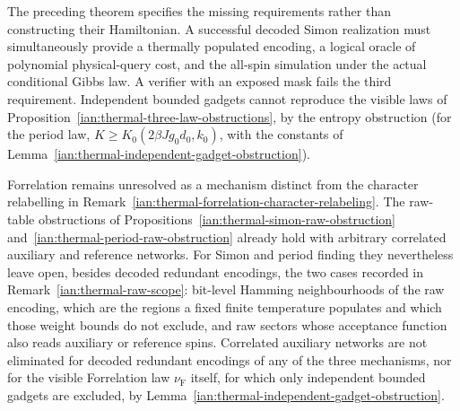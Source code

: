 \begin{remark}
\label{ian:thermal-realization-open}
The preceding theorem specifies the missing requirements rather than
constructing their Hamiltonian. A successful decoded Simon
realization must simultaneously provide a thermally populated
encoding, a logical oracle of polynomial physical-query cost, and
the all-spin simulation under the actual conditional Gibbs law.
A verifier with an exposed mask fails the third requirement.
Independent bounded gadgets cannot reproduce the visible laws of
Proposition~\ref{ian:thermal-three-law-obstructions}, by the entropy
obstruction (for the period law, \(K\ge K_0(2\beta Jg_0d_0,k_0)\),
with the constants of
Lemma~\ref{ian:thermal-independent-gadget-obstruction}).

Forrelation remains unresolved as a mechanism distinct from the
character relabelling in
Remark~\ref{ian:thermal-forrelation-character-relabeling}.
The raw-table obstructions of
Propositions~\ref{ian:thermal-simon-raw-obstruction}
and~\ref{ian:thermal-period-raw-obstruction} already hold with
arbitrary correlated auxiliary and reference networks. For Simon and
period finding they nevertheless leave open, besides decoded redundant
encodings, the two cases recorded in
Remark~\ref{ian:thermal-raw-scope}: bit-level Hamming neighbourhoods
of the raw encoding, which are the regions a fixed finite temperature
populates and which those weight bounds do not exclude, and raw
sectors whose acceptance function also reads auxiliary or reference
spins. Correlated
auxiliary networks are not eliminated for decoded redundant encodings
of any of the three mechanisms, nor for the visible Forrelation law
\(\nu_{\mathrm F}\) itself, for which only independent bounded gadgets
are excluded, by
Lemma~\ref{ian:thermal-independent-gadget-obstruction}.
\end{remark}
